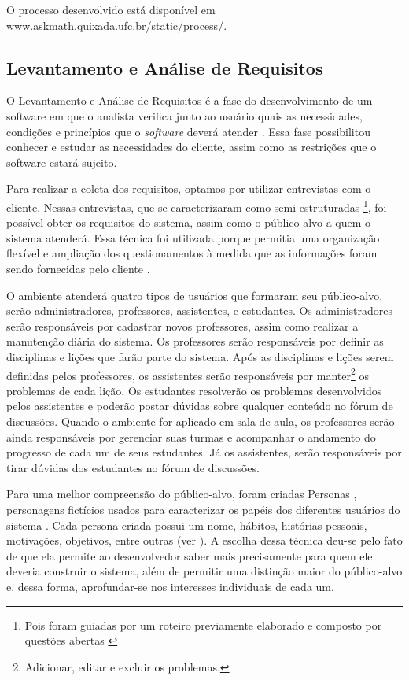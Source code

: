 O processo desenvolvido est\'a dispon\'ivel em \url{www.askmath.quixada.ufc.br/static/process/}. 

\subsection{Levantamento e Análise de Requisitos}


O Levantamento e An\'alise de Requisitos é a fase do desenvolvimento de um software em que o analista verifica junto ao usuário quais as necessidades, condições e princípios que o \textit{software} 
deverá atender \cite{matuda2013mapas}. Essa fase possibilitou conhecer e estudar as necessidades do cliente, assim como as restrições que o software estará sujeito.

Para realizar a coleta dos requisitos, optamos por utilizar entrevistas com o cliente. Nessas entrevistas, que se caracterizaram como semi-estruturadas \footnote{Pois foram guiadas por um roteiro 
previamente elaborado e composto por questões abertas \cite{belei2008uso}}, foi possível obter os requisitos do sistema, assim como o público-alvo a quem o sistema atenderá. Essa técnica foi utilizada 
porque permitia uma organização flexível e ampliação dos questionamentos à medida que as informações foram sendo fornecidas pelo cliente \cite{fujisawa2000utilizaccao}.

O ambiente atender\'a quatro tipos de usu\'arios que formaram seu p\'ublico-alvo, ser\~ao administradores, professores, assistentes, e estudantes. Os administradores ser\~ao respons\'aveis por 
cadastrar 
novos professores, assim como realizar a manuten\c{c}\~ao di\'aria do sistema. Os professores ser\~ao responsáveis por definir as disciplinas e li\c{c}\~oes que far\~ao parte do sistema. 
Ap\'os as disciplinas e li\c{c}\~oes serem definidas pelos professores, os assistentes ser\~ao respons\'aveis por manter\footnote{Adicionar, editar e excluir os problemas.} os problemas de cada 
li\c{c}\~ao. Os estudantes resolver\~ao os problemas 
desenvolvidos pelos assistentes e poder\~ao postar d\'uvidas sobre qualquer conte\'udo no f\'orum de discuss\~oes. Quando o ambiente for aplicado em sala de aula, os professores ser\~ao ainda 
respons\'aveis por gerenciar suas turmas e acompanhar o andamento do progresso de cada um de seus estudantes. J\'a os assistentes, ser\~ao responsáveis por tirar d\'uvidas dos estudantes no f\'orum 
de discuss\~oes.

Para uma melhor compreensão do público-alvo, foram criadas Personas 
\cite{pruitt2003personas}, personagens fictícios usados para caracterizar os papéis dos diferentes usuários do sistema \cite{guerra2010colaboraccao}. Cada persona criada possui um nome, hábitos, 
histórias pessoais, motivações, objetivos, entre outras (ver ). A escolha dessa técnica deu-se pelo fato de que ela permite ao desenvolvedor saber mais precisamente para 
quem ele deveria construir o sistema, além de permitir uma distinção maior do público-alvo e, dessa forma, aprofundar-se nos interesses individuais de cada um.

